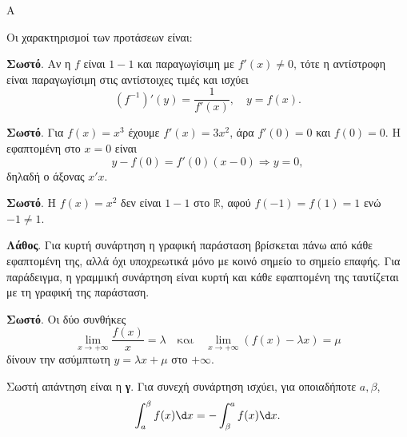 \begin{thema}{Α}
\begin{erwthma}
\item {}

\item {}

\item {}

\item Οι χαρακτηρισμοί των προτάσεων είναι:
\begin{alist}
\item \textbf{Σωστό}. Αν η $f$ είναι $1-1$ και παραγωγίσιμη με $f'(x)\neq0$, τότε η αντίστροφη είναι παραγωγίσιμη στις αντίστοιχες τιμές και ισχύει
\[ (f^{-1})'(y)=\dfrac{1}{f'(x)},\quad y=f(x). \]
\item \textbf{Σωστό}. Για $f(x)=x^3$ έχουμε $f'(x)=3x^2$, άρα $f'(0)=0$ και $f(0)=0$. Η εφαπτομένη στο $x=0$ είναι
\[ y-f(0)=f'(0)(x-0)\Rightarrow y=0, \]
δηλαδή ο άξονας $x'x$.
\item \textbf{Σωστό}. Η $f(x)=x^2$ δεν είναι $1-1$ στο $\mathbb{R}$, αφού $f(-1)=f(1)=1$ ενώ $-1\neq1$.
\item \textbf{Λάθος}. Για κυρτή συνάρτηση η γραφική παράσταση βρίσκεται πάνω από κάθε εφαπτομένη της, αλλά όχι υποχρεωτικά μόνο με κοινό σημείο το σημείο επαφής. Για παράδειγμα, η γραμμική συνάρτηση είναι κυρτή και κάθε εφαπτομένη της ταυτίζεται με τη γραφική της παράσταση.
\item \textbf{Σωστό}. Οι δύο συνθήκες
\[ \lim\limits_{x\to+\infty}\dfrac{f(x)}{x}=\lambda
\quad\textrm{και}\quad
\lim\limits_{x\to+\infty}\left(f(x)-\lambda x\right)=\mu \]
δίνουν την ασύμπτωτη $y=\lambda x+\mu$ στο $+\infty$.
\end{alist}

\item Σωστή απάντηση είναι η \textbf{γ}. Για συνεχή συνάρτηση ισχύει, για οποιαδήποτε $a,\beta$,
\[ \dint_a^\beta f(x)\d x=-\dint_\beta^a f(x)\d x. \]
\end{erwthma}
\end{thema}

